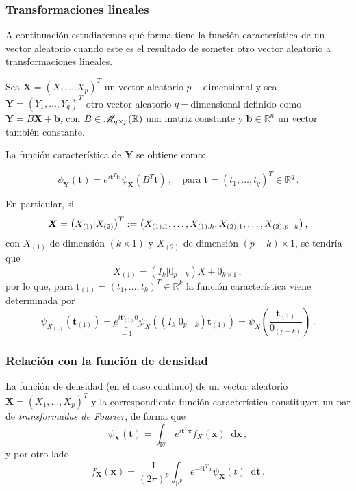 \subsubsection{Transformaciones lineales}

A continuación estudiaremos qué forma tiene la función característica de un vector aleatorio cuando este es el resultado de someter otro vector aleatorio a transformaciones lineales.

Sea $\boldsymbol X = (X_1, \dots X_p)^T$ un vector aleatorio $p-$dimensional y sea $\boldsymbol Y = (Y_1,\dots,Y_q)^T$ otro vector aleatorio $q-$dimensional definido como $\boldsymbol Y = B\boldsymbol X + \boldsymbol b$, con $B \in \mathscr{M}_{q\times p}(\mathbb{R})$ una matriz constante y $\boldsymbol b\in \mathbb R ^n$ un vector también constante.

\begin{nprop} \label{fc:translineal}
  La función característica de $\boldsymbol Y$ se obtiene como:
  
  \[
  \psi_{\boldsymbol Y}(\boldsymbol t) = e^{i\boldsymbol t^T \boldsymbol b} \psi_{\boldsymbol X}(B^T \boldsymbol t)\,, \quad \text{para }\boldsymbol t = (t_1,\dots,t_q)^T \in \mathbb R^q\,.
  \]
\end{nprop}

  En particular, si \[ \boldsymbol{X}= \left( X_{(1)} | X_{(2)}\right)^T := \left(X_{(1),1}, \dots, X_{(1),k}, X_{(2),1}, \dots, X_{(2),p-k}\right),\] con $X_{(1)}$ de dimensión $(k\times1)$ y $X_{(2)}$ de dimensión $(p-k) \times 1$, se tendría que
  \[
X_{(1)} = \left( I_k | 0_{p-k} \right)X + 0_{k\times 1}\,,
\]
por lo que, para $\boldsymbol t_{(1)} = (t_1,\dots,t_k)^T \in \mathbb R^k$ la función característica viene determinada por
\[
\psi_{X_{(1)}}\left(\boldsymbol t_{(1)}\right) = \underbrace{e^{i\boldsymbol t_{(1)}^T 0}}_{=1} \psi_X\left(\left( I_k | 0_{p-k} \right)\boldsymbol t_{(1)}\right) = \psi_X\left(\frac{\boldsymbol t_{(1)}}{0_{(p-k)}}\right)\,.
\]

\subsubsection{Relación con la función de densidad}

La función de densidad (en el caso continuo) de un vector aleatorio $\boldsymbol X = (X_1,\dots,X_p)^T$ y la correspondiente función característica constituyen un par de \emph{transformadas de Fourier}, de forma que
\[
\psi_{\boldsymbol X}(\boldsymbol t) = \int_{\mathbb R ^p} e^{i \boldsymbol t^T \boldsymbol x} f_X(\boldsymbol x) \mathop{}\!\mathrm{d}\boldsymbol x\,,
\]
y por otro lado
\[
f_{\boldsymbol X}(\boldsymbol x) =  \dfrac{1}{(2\pi)^p} \int_{\mathbb R^p} e^{- i \boldsymbol t^T x} \psi_{\boldsymbol X}(t) \mathop{}\!\mathrm{d}\boldsymbol t\,.
\]


